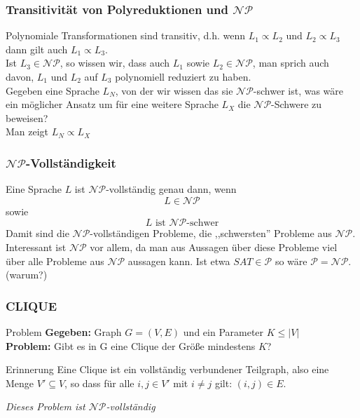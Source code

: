\documentclass{beamer}
\begin{document}
{%
\begin{frame}
\frametitle{Transitivität von Polyreduktionen und $\mathcal{NP}$}
Polynomiale Transformationen sind transitiv, d.h. wenn $L_1 \propto L_2$ und $L_2 \propto L_3$ dann gilt auch $L_1 \propto L_3$.\\[8pt]
Ist $L_3 \in \mathcal{NP}$, so wissen wir, dass auch $L_1$ sowie $L_2 \in \mathcal{NP}$, man sprich auch davon, $L_1$ und $L_2$ auf $L_3$ polynomiell reduziert zu haben.\\[8pt]
Gegeben eine Sprache $L_N$, von der wir wissen das sie $\mathcal{NP}$-schwer ist, was wäre ein möglicher Ansatz um für eine weitere Sprache $L_X$ die $\mathcal{NP}$-Schwere zu beweisen?\\
\pause
Man zeigt $L_N \propto L_X$
\end{frame}

\begin{frame}
\frametitle{$\mathcal{NP}$-Vollständigkeit}
Eine Sprache $L$ ist $\mathcal{NP}$-vollständig genau dann, wenn
$$L \in \mathcal{NP}$$ sowie $$L\mbox{ ist $\mathcal{NP}$-schwer}$$
Damit sind die $\mathcal{NP}$-vollständigen Probleme, die ,,schwersten'' Probleme aus $\mathcal{NP}$.\\
Interessant ist $\mathcal{NP}$ vor allem, da man aus Aussagen über diese Probleme viel über alle Probleme aus $\mathcal{NP}$ aussagen kann.
Ist etwa $SAT \in \mathcal{P}$ so wäre $\mathcal{P} = \mathcal{NP}$. (warum?)
\end{frame}

\begin{frame}
\frametitle{CLIQUE}
\begin{block}{Problem}
\textbf{Gegeben:} Graph $G = (V, E)$ und ein Parameter $K \leq |V|$\\
\textbf{Problem:} Gibt es in G eine Clique der Größe mindestens $K$?
\end{block}
\begin{block}{Erinnerung}
Eine Clique ist ein vollständig verbundener Teilgraph, also eine Menge $V' \subseteq V$, so dass für alle $i,j \in V'$ mit $i\neq j$ gilt: $(i, j) \in E$.
\end{block}
\textit{Dieses Problem ist $\mathcal{NP}$-vollständig}
\end{frame}

}
\end{document}
